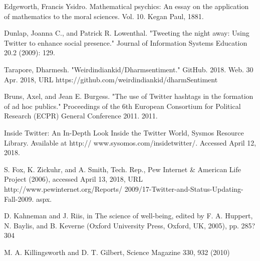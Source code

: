 \documentclass[journal, a4paper]{IEEEtran}
\begin{document}
\begin{thebibliography}{5}
   Edgeworth, Francis Ysidro. Mathematical psychics: An essay on the application of mathematics to the moral sciences. Vol. 10. Kegan Paul, 1881.
   
   Dunlap, Joanna C., and Patrick R. Lowenthal. "Tweeting the night away: Using Twitter to enhance social presence." Journal of Information Systems Education 20.2 (2009): 129.
   
   Tarapore, Dharmesh. "Weirdindiankid/Dharmsentiment." GitHub. 2018. Web. 30 Apr. 2018, URL https://github.com/weirdindiankid/dharmSentiment
   
   Bruns, Axel, and Jean E. Burgess. "The use of Twitter hashtags in the formation of ad hoc publics." Proceedings of the 6th European Consortium for Political Research (ECPR) General Conference 2011. 2011.
   
   Inside Twitter: An In-Depth Look Inside the Twitter World, Sysmos Resource Library. Available at http:// www.sysomos.com/insidetwitter/. Accessed April 12, 2018.
   
   S. Fox, K. Zickuhr, and A. Smith, Tech. Rep., Pew Internet \& American Life Project (2006), accessed April 13, 2018, URL http://www.pewinternet.org/Reports/
2009/17-Twitter-and-Status-Updating-Fall-2009.
aspx.
   
   D. Kahneman and J. Riis, in The science of well-being,
edited by F. A. Huppert, N. Baylis, and B. Keverne
(Oxford University Press, Oxford, UK, 2005), pp. 285?
304
   
   M. A. Killingsworth and D. T. Gilbert, Science Magazine
330, 932 (2010)

\end{thebibliography}

\end{document}
